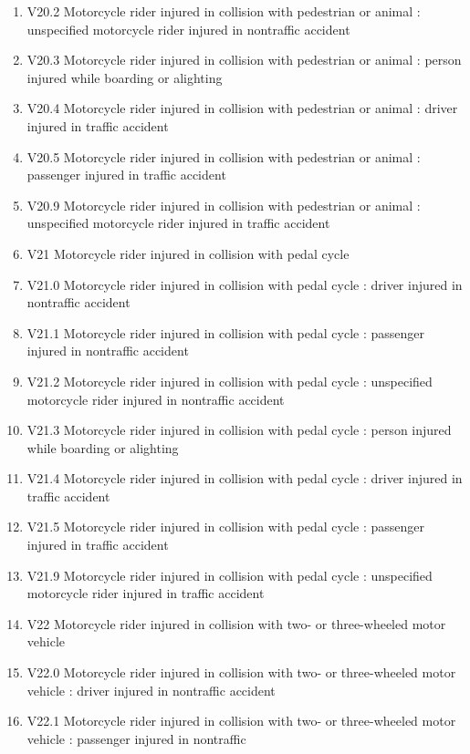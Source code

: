 \documentclass[
]{scrartcl}
\begin{document}
\begin{itemize}
\begin{enumerate}
  \item
    V20.2 Motorcycle rider injured in collision with pedestrian or
    animal : unspecified motorcycle rider injured in nontraffic accident
  \item
    V20.3 Motorcycle rider injured in collision with pedestrian or
    animal : person injured while boarding or alighting
  \item
    V20.4 Motorcycle rider injured in collision with pedestrian or
    animal : driver injured in traffic accident
  \item
    V20.5 Motorcycle rider injured in collision with pedestrian or
    animal : passenger injured in traffic accident
  \item
    V20.9 Motorcycle rider injured in collision with pedestrian or
    animal : unspecified motorcycle rider injured in traffic accident
  \item
    V21 Motorcycle rider injured in collision with pedal cycle
  \item
    V21.0 Motorcycle rider injured in collision with pedal cycle :
    driver injured in nontraffic accident
  \item
    V21.1 Motorcycle rider injured in collision with pedal cycle :
    passenger injured in nontraffic accident
  \item
    V21.2 Motorcycle rider injured in collision with pedal cycle :
    unspecified motorcycle rider injured in nontraffic accident
  \item
    V21.3 Motorcycle rider injured in collision with pedal cycle :
    person injured while boarding or alighting
  \item
    V21.4 Motorcycle rider injured in collision with pedal cycle :
    driver injured in traffic accident
  \item
    V21.5 Motorcycle rider injured in collision with pedal cycle :
    passenger injured in traffic accident
  \item
    V21.9 Motorcycle rider injured in collision with pedal cycle :
    unspecified motorcycle rider injured in traffic accident
  \item
    V22 Motorcycle rider injured in collision with two- or three-wheeled
    motor vehicle
  \item
    V22.0 Motorcycle rider injured in collision with two- or
    three-wheeled motor vehicle : driver injured in nontraffic accident
  \item
    V22.1 Motorcycle rider injured in collision with two- or
    three-wheeled motor vehicle : passenger injured in nontraffic

\end{enumerate}
\end{itemize}
\end{document}
